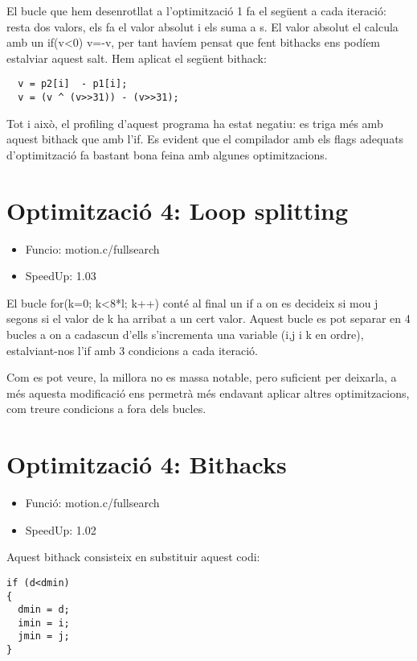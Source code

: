 El bucle que hem desenrotllat a l'optimització 1 fa el següent a cada iteració: resta dos valors, els fa el valor absolut i els suma a s. El valor absolut el calcula amb un if(v<0) v=-v, per tant havíem pensat que fent bithacks ens podíem estalviar aquest salt. Hem aplicat el següent bithack:

\begin{lstlisting}
  v = p2[i]  - p1[i];
  v = (v ^ (v>>31)) - (v>>31);
\end{lstlisting}
 

Tot i això, el profiling d'aquest programa ha estat negatiu: es triga més amb aquest bithack que amb l'if. Es evident que el compilador amb els flags adequats d'optimització fa bastant bona feina amb algunes optimitzacions.
              

\section{Optimitzaci\'o 4: Loop splitting}
\begin{itemize}
\item{Funcio: motion.c/fullsearch}
\item{SpeedUp: 1.03}
\end{itemize}

El bucle for(k=0; k<8*l; k++) conté al final un if a on es decideix si mou j segons si el valor de k ha arribat a un cert valor. Aquest bucle es pot separar en 4 bucles a on a cadascun d'ells s'incrementa una variable (i,j i k en ordre), estalviant-nos l'if amb 3 condicions a cada iteració.

Com es pot veure, la millora no es massa notable, pero suficient per deixarla, a més aquesta modificació ens permetrà més endavant aplicar altres optimitzacions, com treure condicions a fora dels bucles.

\section{Optimitzaci\'o 4: Bithacks}
\begin{itemize}
\item{Funció: motion.c/fullsearch}
\item{SpeedUp:  1.02}
\end{itemize}

Aquest bithack consisteix en substituir aquest codi:

\begin{lstlisting}
if (d<dmin)
{
  dmin = d;
  imin = i;
  jmin = j;
}

\end{lstlisting}


